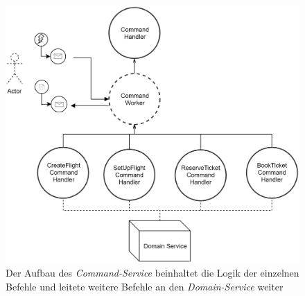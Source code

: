  \begin{figure}
    \centering
    \includegraphics[width=0.8\linewidth]{gfx/implementation/CommandServiceActorModel}
    \caption{Der Aufbau des \textit{Command-Service} beinhaltet die Logik der einzelnen Befehle und leitete weitere Befehle an den \textit{Domain-Service} weiter }
    \label{fig:implementation:commandActorModel}
\end{figure} 

